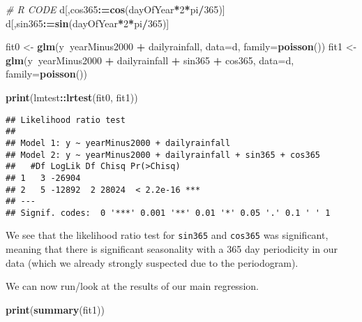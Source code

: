 \documentclass[]{book}
\newenvironment{Shaded}{\begin{snugshade}}{\end{snugshade}}
\newcommand{\KeywordTok}[1]{\textcolor[rgb]{0.13,0.29,0.53}{\textbf{#1}}}
\newcommand{\DataTypeTok}[1]{\textcolor[rgb]{0.13,0.29,0.53}{#1}}
\newcommand{\DecValTok}[1]{\textcolor[rgb]{0.00,0.00,0.81}{#1}}
\newcommand{\StringTok}[1]{\textcolor[rgb]{0.31,0.60,0.02}{#1}}
\newcommand{\CommentTok}[1]{\textcolor[rgb]{0.56,0.35,0.01}{\textit{#1}}}
\newcommand{\OperatorTok}[1]{\textcolor[rgb]{0.81,0.36,0.00}{\textbf{#1}}}
\newcommand{\ErrorTok}[1]{\textcolor[rgb]{0.64,0.00,0.00}{\textbf{#1}}}
\newcommand{\NormalTok}[1]{#1}
\begin{document}
\begin{Shaded}
\begin{Highlighting}[]
\CommentTok{# R CODE}
\NormalTok{d[,cos365}\OperatorTok{:}\ErrorTok{=}\KeywordTok{cos}\NormalTok{(dayOfYear}\OperatorTok{*}\DecValTok{2}\OperatorTok{*}\NormalTok{pi}\OperatorTok{/}\DecValTok{365}\NormalTok{)]}
\NormalTok{d[,sin365}\OperatorTok{:}\ErrorTok{=}\KeywordTok{sin}\NormalTok{(dayOfYear}\OperatorTok{*}\DecValTok{2}\OperatorTok{*}\NormalTok{pi}\OperatorTok{/}\DecValTok{365}\NormalTok{)]}

\NormalTok{fit0 <-}\StringTok{ }\KeywordTok{glm}\NormalTok{(y}\OperatorTok{~}\NormalTok{yearMinus2000 }\OperatorTok{+}\StringTok{ }\NormalTok{dailyrainfall, }\DataTypeTok{data=}\NormalTok{d, }\DataTypeTok{family=}\KeywordTok{poisson}\NormalTok{())}
\NormalTok{fit1 <-}\StringTok{ }\KeywordTok{glm}\NormalTok{(y}\OperatorTok{~}\NormalTok{yearMinus2000 }\OperatorTok{+}\StringTok{ }\NormalTok{dailyrainfall }\OperatorTok{+}\StringTok{ }\NormalTok{sin365 }\OperatorTok{+}\StringTok{ }\NormalTok{cos365, }\DataTypeTok{data=}\NormalTok{d, }\DataTypeTok{family=}\KeywordTok{poisson}\NormalTok{())}

\KeywordTok{print}\NormalTok{(lmtest}\OperatorTok{::}\KeywordTok{lrtest}\NormalTok{(fit0, fit1))}
\end{Highlighting}
\end{Shaded}

\begin{verbatim}
## Likelihood ratio test
## 
## Model 1: y ~ yearMinus2000 + dailyrainfall
## Model 2: y ~ yearMinus2000 + dailyrainfall + sin365 + cos365
##   #Df LogLik Df Chisq Pr(>Chisq)    
## 1   3 -26904                        
## 2   5 -12892  2 28024  < 2.2e-16 ***
## ---
## Signif. codes:  0 '***' 0.001 '**' 0.01 '*' 0.05 '.' 0.1 ' ' 1
\end{verbatim}

We see that the likelihood ratio test for \texttt{sin365} and
\texttt{cos365} was significant, meaning that there is significant
seasonality with a 365 day periodicity in our data (which we already
strongly suspected due to the periodogram).

\newpage

We can now run/look at the results of our main regression.

\begin{Shaded}
\begin{Highlighting}[]
\KeywordTok{print}\NormalTok{(}\KeywordTok{summary}\NormalTok{(fit1))}
\end{Highlighting}
\end{Shaded}
\end{document}
